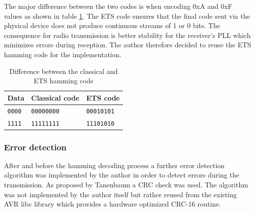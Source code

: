The major difference between the two codes is when encoding 0xA and 0xF values as shown in table \ref{tab:hamming_diff}. The ETS code ensures that the final code sent via the physical device does not produce continuous streams of 1 or 0 bits. The consequence for radio transmission is better stability for the receiver's PLL which minimizes errors during reception. The author therefore decided to reuse the ETS hamming code for the implementation.

\begin{table}[H]
\centering
\begin{tabular}{l | l | l}
Data & Classical code & ETS code \\
\hline
\texttt{0000} & \texttt{00000000} & \texttt{00010101} \\
\texttt{1111} & \texttt{11111111} & \texttt{11101010} \\
\end{tabular}
\caption{Difference between the classical and ETS hamming code}
\label{tab:hamming_diff}
\end{table}

\subsubsection{Error detection}%
After and before the hamming decoding process a further error detection algorithm was implemented by the author in order to detect errors during the transmission. As proposed by Tanenbaum a CRC check was used. The algorithm was not implemented by the author itself but rather reused from the existing AVR libc library which provides a hardware optimized CRC-16 routine.

